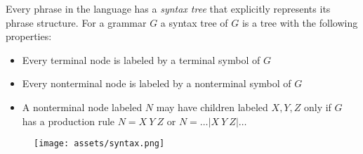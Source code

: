 
Every phrase in the language has a \emph{syntax tree} that explicitly
represents its phrase structure. For a grammar \(G\) a syntax tree of
\(G\) is a tree with the following properties:

\begin{itemize}
\item
  Every terminal node is labeled by a terminal symbol of \(G\)
\item
  Every nonterminal node is labeled by a nonterminal symbol of \(G\)
\item
  A nonterminal node labeled \(N\) may have children labeled \(X,Y,Z\)
  only if \(G\) has a production rule \(N = X\ Y\ Z\) or
  \(N = \dots | X \ Y \ Z | \dots\)
\end{itemize}

\begin{figure}[H]
\centering
\texttt{[image: assets/syntax.png]}
\end{figure}
